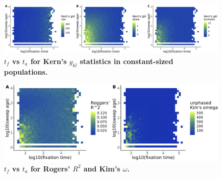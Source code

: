 \documentclass[12pt]{article}
\begin{document}
\begin{figure}[H]
\centering
  \includegraphics[width=\textwidth]{figures/appendix_g/split_tf_ta_gkl_2025-03-09.png}
  \caption{\textbf{$t_f$ vs $t_a$ for Kern's $g_{kl}$ statistics in constant-sized populations.}}
  \label{fig:ident_gkl}
\end{figure}

\begin{figure}[H]
\centering
  \includegraphics[width=\textwidth]{figures/appendix_g/split_tf_ta_ld_2025-03-09.png}
  \caption{\textbf{$t_f$ vs $t_a$ for Rogers' $R^2$ and Kim's $\omega$.}}
  \label{fig:ident_ld}
\end{figure}
\end{document}
